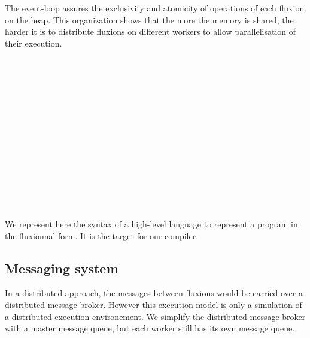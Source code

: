 The event-loop assures the exclusivity and atomicity of operations of each fluxion on the heap.
This organization shows that the more the memory is shared, the harder it is to distribute fluxions on different workers to allow parallelisation of their execution.

\begin{bnf*}
      { \bnfor {} \bnfsp {} \bnfsp {}}\\
          { \bnfsp {} \bnfsp {} \bnfsp {} \bnfsp {} \bnfsp {} \bnfsp {} \bnfsp {}}\\
       { \bnfsp {} \bnfor {}}\\
      { \bnfor {} \bnfor {} \bnfsp {} \bnfsp {}}\\
       { \bnfsp {} }\\
         {}\\
          {\bnfts{\texttt{\{}}  \bnfts{\texttt{\}}}}\\
          {\bnfts{\texttt{[}}  \bnfts{\texttt{]}}}\\
         { \bnfor {} \bnfsp \bnfts{,} \bnfsp {}}\\
           {\bnfts{\texttt{>}\texttt{>}} \bnfor \bnfts{\texttt{-}\texttt{>}}}\\
           {}\\
           {}\\
\end{bnf*}
\vspace{-1.5\baselineskip}~\\

We represent here the syntax of a high-level language to represent a program in the fluxionnal form.
It is the target for our compiler.

\subsection{Messaging system}

In a distributed approach, the messages between fluxions would be carried over a distributed message broker.
However this execution model is only a simulation of a distributed execution environement.
We simplify the distributed message broker with a master message queue, but each worker still has its own message queue.

